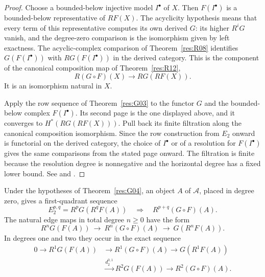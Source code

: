\begin{proof}
Choose a bounded-below injective model \(I^\bullet\) of \(X\).
Then \(F(I^\bullet)\) is a bounded-below representative of \(RF(X)\).
The acyclicity hypothesis means that every term of this representative
computes its own derived \(G\): its higher \(R^iG\) vanish, and
the degree-zero comparison is the isomorphism given by left exactness.
The acyclic-complex comparison of Theorem~\ref{res:R08} identifies
\(G(F(I^\bullet))\) with \(RG(F(I^\bullet))\) in the derived category.
This is the component of the canonical composition map of
Theorem~\ref{res:R12},
\[
           R(G\circ F)(X)\longrightarrow RG(RF(X)).
\]
It is an isomorphism natural in \(X\).

Apply the row sequence of Theorem~\ref{res:G03} to the functor \(G\)
and the bounded-below complex \(F(I^\bullet)\). Its second page is
the one displayed above, and it converges to \(H^*(RG(RF(X)))\).
Pull back its finite filtration along the canonical composition
isomorphism. Since the row construction from \(E_2\) onward is
functorial on the derived category, the choice of \(I^\bullet\)
or of a resolution for \(F(I^\bullet)\) gives the same comparisons
from the stated page onward. The filtration is finite because
the resolution degree is nonnegative and the horizontal degree
has a fixed lower bound. See \cite[Tags 015M and 015N]{stacks-derived}
and \cite[Section 5.8]{weibel}.
\end{proof}

\begin{corollary}
\label{res:G05}
Under the hypotheses of Theorem~\ref{res:G04}, an object \(A\) of
\(\mathcal A\), placed in degree zero, gives a first-quadrant sequence
\[
      E_2^{p,q}=R^pG(R^qF(A))
       \quad\Longrightarrow\quad R^{p+q}(G\circ F)(A).
\]
The natural edge maps in total degree \(n\ge0\) have the form
\[
 R^nG(F(A))\ \longrightarrow\ R^n(G\circ F)(A)\
                    \longrightarrow\ G(R^nF(A)).
\]
In degrees one and two they occur in the exact sequence
\[
\begin{split}
 0\longrightarrow R^1G(F(A))
 &\longrightarrow R^1(G\circ F)(A)
 \longrightarrow G(R^1F(A))\\
 &\xrightarrow{d_2^{0,1}} R^2G(F(A))
 \longrightarrow R^2(G\circ F)(A).
\end{split}
\]
\end{corollary}

